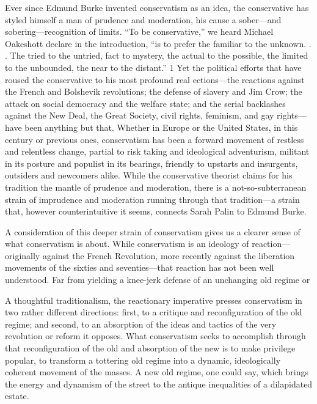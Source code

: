 Ever since Edmund Burke invented conservatism as an idea, the conservative has styled himself a man of prudence and moderation, his cause a sober—and sobering—recognition of limits. “To be conservative,” we heard Michael Oakeshott declare in the introduction, “is to prefer the familiar to the unknown. . . The tried to the untried, fact to mystery, the actual to the possible, the limited to the unbounded, the near to the distant.” {\color{blue}1} Yet the political efforts that have roused the conservative to his most profound real ections—the reactions against the French and Bolshevik revolutions; the defense of slavery and Jim Crow; the attack on social democracy and the welfare state; and the serial backlashes against the New Deal, the Great Society, civil rights, feminism, and gay rights— have been anything but that. Whether in Europe or the United States, in this century or previous ones, conservatism has been a forward movement of restless and relentless change, partial to risk taking and ideological adventurism, militant in its posture and populist in its bearings, friendly to upstarts and insurgents, outsiders and newcomers alike. While the conservative theorist claims for his tradition the mantle of prudence and moderation, there is a not-so-subterranean strain of imprudence and moderation running through that tradition—a strain that, however counterintuitive it seems, connects Sarah Palin to Edmund Burke.
 \par 
A consideration of this deeper strain of conservatism gives us a clearer sense of what conservatism is about. While conservatism is an ideology of reaction—originally against the French Revolution, more recently against the liberation movements of the sixties and seventies—that reaction has not been well understood. Far from yielding a knee-jerk defense of an unchanging old regime or
 \par 
A thoughtful traditionalism, the reactionary imperative presses conservatism in two rather different directions: first, to a critique and reconfiguration of the old regime; and second, to an absorption of the ideas and tactics of the very revolution or reform it opposes. What conservatism seeks to accomplish through that reconfiguration of the old and absorption of the new is to make privilege popular, to transform a tottering old regime into a dynamic, ideologically coherent movement of the masses. A new old regime, one could say, which brings the energy and dynamism of the street to the antique inequalities of a dilapidated estate.
 \par 
